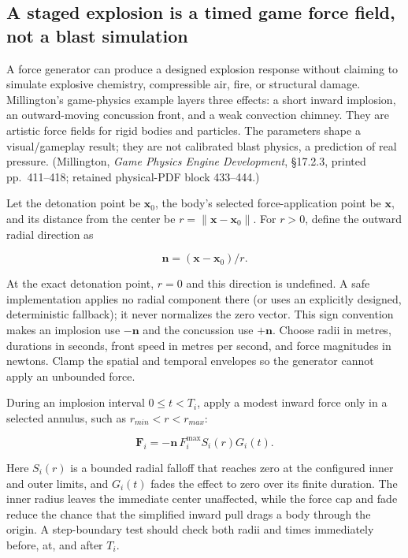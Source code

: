 \subsection{A staged explosion is a timed game force field, not a blast simulation}\label{06-engine-ii-ch034-a-staged-explosion-is-a-timed-game-force-field-not-a-blast-simulation}

\hypertarget{06-engine-ii-ch034-a-staged-explosion-is-a-timed-game-force-field-not-a-blast-simulation}{}

A force generator can produce a designed explosion response without claiming to simulate explosive chemistry, compressible air, fire, or structural damage. Millington's game-physics example layers three effects: a short inward implosion, an outward-moving concussion front, and a weak convection chimney. They are artistic force fields for rigid bodies and particles. The parameters shape a visual/gameplay result; they are not calibrated blast physics, a prediction of real pressure. (Millington, \emph{Game Physics Engine Development}, §17.2.3, printed pp.~411--418; retained physical-PDF block 433--444.)

Let the detonation point be \(\mathbf{x}_0\), the body's selected force-application point be \(\mathbf{x}\), and its distance from the center be \(r=\lVert\mathbf{x}-\mathbf{x}_0\rVert\). For \(r>0\), define the outward radial direction as

\[
\mathbf{n}=(\mathbf{x}-\mathbf{x}_0)/r.
\]

At the exact detonation point, \(r=0\) and this direction is undefined. A safe implementation applies no radial component there (or uses an explicitly designed, deterministic fallback); it never normalizes the zero vector. This sign convention makes an implosion use \(-\mathbf n\) and the concussion use \(+\mathbf n\). Choose radii in metres, durations in seconds, front speed in metres per second, and force magnitudes in newtons. Clamp the spatial and temporal envelopes so the generator cannot apply an unbounded force.

During an implosion interval \(0\leq  t<T_i\), apply a modest inward force only in a selected annulus, such as \(r_{min}<r<r_{max}\):

\[
\mathbf F_i=-\mathbf n\,F_i^{\max}S_i(r)G_i(t).
\]

Here \(S_i(r)\) is a bounded radial falloff that reaches zero at the configured inner and outer limits, and \(G_i(t)\) fades the effect to zero over its finite duration. The inner radius leaves the immediate center unaffected, while the force cap and fade reduce the chance that the simplified inward pull drags a body through the origin. A step-boundary test should check both radii and times immediately before, at, and after \(T_i\).

